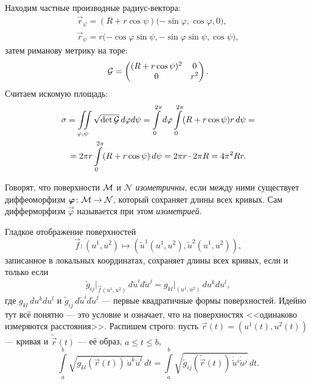 \begin{solution}
	Находим частные производные радиус-вектора:
	\begin{gather*}
		\vec{r}_\varphi = (R + r\cos\psi)\big({-\sin\varphi}, \cos\varphi, 0\big),\\
		\vec{r}_\psi = r\big({-\cos\varphi\sin\psi}, -\sin\varphi\sin\psi, \cos\psi\big),
	\end{gather*}
	затем риманову метрику на торе:
	\[
		\mathcal{G} =
		\begin{pmatrix}
			(R + r\cos\psi)^2 & 0\\
			0 & r^2
		\end{pmatrix}.
	\]
	Считаем искомую площадь:
	\begin{multline*}
		\sigma = \iint\limits_{\varphi, \psi}\sqrt{\det\mathcal{G}}\,d\varphi d\psi = \int\limits_0^{2\pi}d\varphi\int\limits_0^{2\pi}(R + r\cos\psi)r\,d\psi =\\ = 2\pi r\int\limits_0^{2\pi}(R + r\cos\psi)\,d\psi = 2\pi r \cdot 2\pi R = 4\pi^2 Rr.
	\end{multline*}
\end{solution}

\begin{definition}
	Говорят, что поверхности $\mathcal{M}$ и $\mathcal{N}$ \textit{изометричны}, если между ними существует диффеоморфизм $\boldsymbol{\varphi}\colon \mathcal{M} \to \mathcal{N}$, который сохраняет длины всех кривых. Сам дифферморфизм $\vec{\varphi}$ называется при этом \textit{изометрией}.
\end{definition}

\noindent
Гладкое отображение поверхностей
\[
	\vec{f}\colon (u^1, u^2) \mapsto (\widetilde{u}^1(u^1, u^2), \widetilde{u}^2(u^1, u^2)),
\]
записанное в локальных координатах, сохраняет длины всех кривых, если и только если
\begin{equation} \label{eq:Isometry}
	\widetilde{g}_{ij}\big|_{\vec{f}(u^1, u^2)}\,d\widetilde{u}^id\widetilde{u}^j = g_{kl}\big|_{(u^1, u^2)}\,du^kdu^l,
\end{equation}
где $g_{kl}\,du^kdu^l$ и $\widetilde{g}_{ij}\,d\widetilde{u}^id\widetilde{u}^j$ --- первые квадратичные формы поверхностей. Идейно тут всё понятно --- это условие и означает, что на поверхностях <<одинаково измеряются расстояния>>. Распишем строго: пусть $\vec{r}(t) = (u^1(t), u^2(t))$ --- кривая и $\widetilde{\vec{r}}(t)$ --- её образ, $a \leqslant t \leqslant b$,
\[
	\int\limits_a^b\sqrt{g_{kl}(\vec{r}(t))\,\dot{u}^k\dot{u}^l}\,dt = \int\limits_a^b\sqrt{\widetilde{g}_{ij}(\widetilde{\vec{r}}(t))\,\dot{\widetilde{u}}{}^i\dot{\widetilde{u}}{}^j}\,dt.
\]

